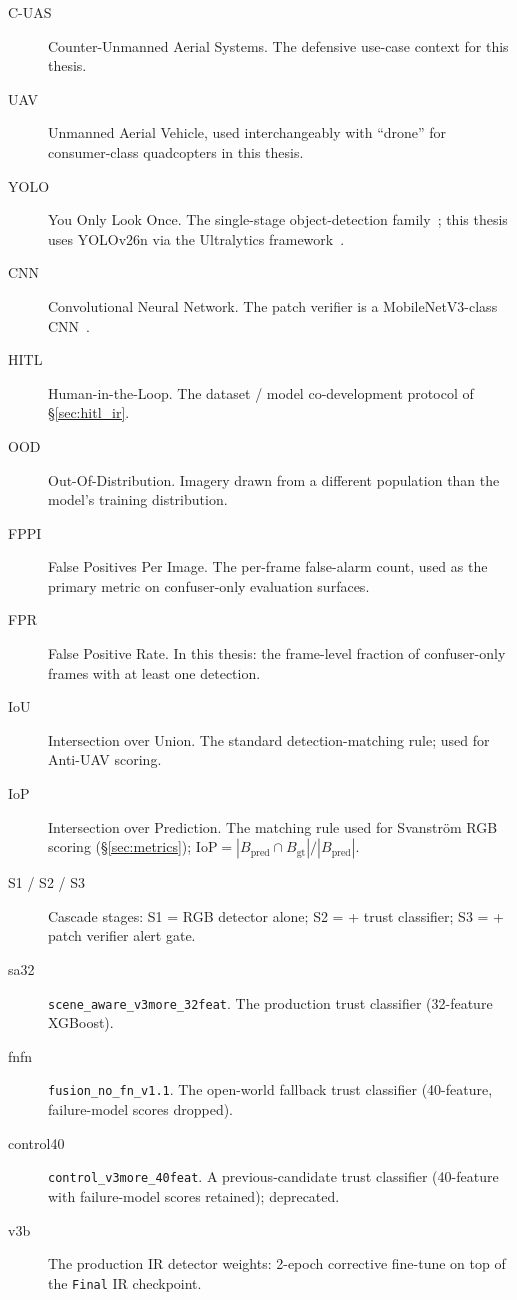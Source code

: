 \documentclass[12pt,a4paper,oneside,openright]{book}
\begin{document}
\begin{description}
    \item[C-UAS] Counter-Unmanned Aerial Systems. The defensive use-case context for this thesis.
    \item[UAV] Unmanned Aerial Vehicle, used interchangeably with ``drone'' for consumer-class quadcopters in this thesis.
    \item[YOLO] You Only Look Once. The single-stage object-detection family~\cite{redmon2016yolo}; this thesis uses YOLOv26n via the Ultralytics framework~\cite{ultralytics2024}.
    \item[CNN] Convolutional Neural Network. The patch verifier is a MobileNetV3-class CNN~\cite{howard2019mobilenetv3}.
    \item[HITL] Human-in-the-Loop. The dataset / model co-development protocol of \S\ref{sec:hitl_ir}.
    \item[OOD] Out-Of-Distribution. Imagery drawn from a different population than the model's training distribution.
    \item[FPPI] False Positives Per Image. The per-frame false-alarm count, used as the primary metric on confuser-only evaluation surfaces.
    \item[FPR] False Positive Rate. In this thesis: the frame-level fraction of confuser-only frames with at least one detection.
    \item[IoU] Intersection over Union. The standard detection-matching rule; used for Anti-UAV scoring.
    \item[IoP] Intersection over Prediction. The matching rule used for Svanstr\"om RGB scoring (\S\ref{sec:metrics}); $\text{IoP} = |B_\text{pred} \cap B_\text{gt}| / |B_\text{pred}|$.
    \item[S1 / S2 / S3] Cascade stages: S1 = RGB detector alone; S2 = + trust classifier; S3 = + patch verifier alert gate.
    \item[sa32] \texttt{scene\_aware\_v3more\_32feat}. The production trust classifier (32-feature XGBoost).
    \item[fnfn] \texttt{fusion\_no\_fn\_v1.1}. The open-world fallback trust classifier (40-feature, failure-model scores dropped).
    \item[control40] \texttt{control\_v3more\_40feat}. A previous-candidate trust classifier (40-feature with failure-model scores retained); deprecated.
    \item[v3b] The production IR detector weights: 2-epoch corrective fine-tune on top of the \texttt{Final} IR checkpoint.

\end{description}
\end{document}
